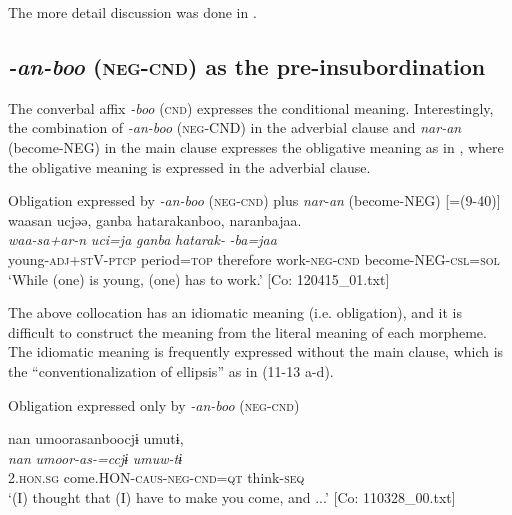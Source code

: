 The more detail discussion was done in .

\subsection{\textit{{}-an-boo} (\textsc{neg}-\textsc{cnd}) as the pre-insubordination}\label{sec:11.2.4}

The converbal affix \textit{{}-boo} (\textsc{cnd}) expresses the conditional meaning. Interestingly, the combination of \textit{{}-an-boo} (\textsc{neg}-CND) in the adverbial clause and \textit{nar-an} (become-NEG) in the main clause expresses the obligative meaning as in , where the obligative meaning is expressed in the adverbial clause.

\ea\label{ex:11-12}  Obligation expressed by \textit{{}-an-boo} (\textsc{neg}-\textsc{cnd}) plus \textit{nar-an} (become-NEG) [=(9-40)]\\
  
      \glll    waasan  ucjəə,  ganba  hatarakanboo, naranbajaa.\\
    \textit{waa-sa+ar-n}  \textit{uci=ja}  \textit{ganba}  \textit{hatarak-} \textit{-ba=jaa}\\
    young-\textsc{adj}+\textsc{st}V-\textsc{ptcp}  period=\textsc{top}  therefore  work-\textsc{neg}-\textsc{cnd}  become-NEG-\textsc{csl}=\textsc{sol}\\
    \glt ‘While (one) is young, (one) has to work.’     [Co: 120415\_01.txt]
\z

The above collocation has an idiomatic meaning (i.e. obligation), and it is difficult to construct the meaning from the literal meaning of each morpheme. The idiomatic meaning is frequently expressed without the main clause, which is the “conventionalization of ellipsis” \citep[372-373]{Evans2007} as in (11-13 a-d).

\ea\label{ex:11-13}  Obligation expressed only by \textit{{}-an-boo} (\textsc{neg}-\textsc{cnd})

  \ea\relax  [= (8-122 b)]

    
      \glll    nan  umoorasanboocjɨ  umutɨ,\\
      \textit{nan}  \textit{umoor-as-=ccjɨ}  \textit{umuw-tɨ}\\
      2.\textsc{hon}.\textsc{sg}  come.HON-\textsc{caus}-\textsc{neg}-\textsc{cnd}=\textsc{qt}  think-\textsc{seq}\\
      \glt       ‘(I) thought that (I) have to make you come, and ...’ [Co: 110328\_00.txt]

